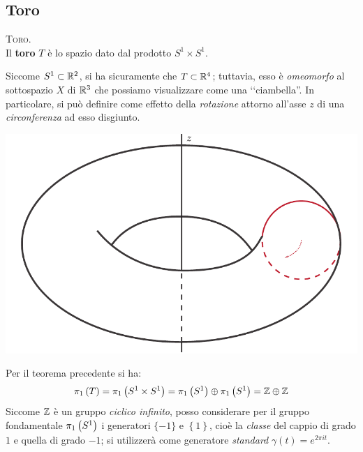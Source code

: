 \subsection{Toro}
\begin{define}\textsc{Toro.}\\
	Il \textbf{toro} $T$ è lo spazio dato dal prodotto $S^1\times S^1$.
\end{define}
	Siccome $S^1\subset\mathbb{R}^2$, si ha sicuramente che $T\subset \mathbb{R}^4$; tuttavia, esso è \textit{omeomorfo} al sottospazio $X$ di $\mathbb{R}^3$ che possiamo visualizzare come una ‘‘ciambella''.
	In particolare, si può definire come effetto della \textit{rotazione} attorno all'asse $z$ di una \textit{circonferenza} ad esso disgiunto.\\
	\begin{minipage}{.42\linewidth}
		\begin{center}
				\includegraphics[trim=0cm 0cm 0cm 0cm,clip,scale=0.45]{images/torusalone.pdf}
		\end{center}

	\end{minipage}
	\begin{minipage}{.57\linewidth}
	Per il teorema precedente si ha: 
\begin{equation*}
	\gruf{T}{\ }=\gruf{S^1\times S^1}{\ }=\gruf{S^1}{\ }\oplus\gruf{S^1}{\ }=\integerset\oplus\integerset
\end{equation*}
Siccome $\mathbb{Z}$ è un gruppo \textit{ciclico infinito}, posso considerare per il gruppo fondamentale $\gruf{S^1}{\ }$ i generatori $\{-1\}$ e $\left\{1\right\}$, cioè la \textit{classe} del cappio di grado $1$ e quella di grado $-1$; si utilizzerà come generatore \textit{standard} $\gamma(t)=e^{2\pi i t}$.
	\end{minipage}\\
